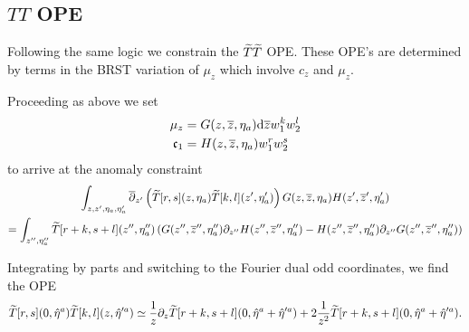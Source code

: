 \documentclass[../main.tex]{subfiles}
\begin{document}
\subsection{$TT$ OPE}
\label{sec:TT1}

Following the same logic we constrain the $\widetilde{T}\widetilde{T}$ OPE. 
These OPE's are determined by terms in the BRST variation of $\mu_z$ which involve $c_z$ and $\mu_z$. 

Proceeding as above we set
\begin{align*}
\mu_z & = G(z,{\overline{z}},\eta_a) \mathrm{d} {\overline{z}} w_1^k w_2^l \\
\mathfrak{c}_1 & = H(z,{\overline{z}},\eta_a) w_1^r w_2^s
\end{align*}
to arrive at the anomaly constraint
\begin{multline}
\int_{z,z',\eta_a,\eta_a'} \overline{\partial}_{z'} \left(\widetilde{T}[r,s](z,\eta_a) \widetilde{T}[k,l](z',\eta_a') \right) G(z,{\overline{z}},\eta_a) H(z',{\overline{z}}',\eta_a') \\
= \int_{z'',\eta''_a} \widetilde{T} [r+k, s+l]  (z'', \eta_a'') \left(G(z'',{\overline{z}}'', \eta_a'') \partial_{z''} H(z'', {\overline{z}}'', \eta_a'') - H(z'', {\overline{z}}'', \eta_a'') \partial_{z''} G(z'',{\overline{z}}'', \eta_a'') \right) 
\end{multline}

Integrating by parts and switching to the Fourier dual odd coordinates, we find the OPE 
\begin{equation}\label{ope:TT}
\widetilde{T}[r,s] (0,\Hat\eta^a) \widetilde{T}[k,l] (z, \Hat\eta'^a) \simeq \frac1z \partial_z \widetilde{T}[r+k, s+l]  (0,\Hat\eta^a + \Hat\eta'^a) + 2 \frac{1}{z^2} \widetilde{T}[r+k, s+l]  (0,\Hat\eta^a + \Hat\eta'^a) .
\end{equation}

\subsubsection{}
\end{document}
